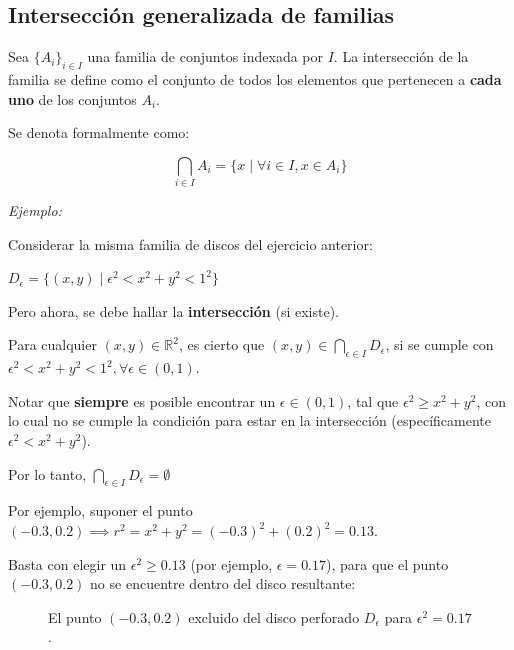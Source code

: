 \documentclass{article}
\begin{document}
\subsection{Intersección generalizada de familias}

Sea $\{A_i\}_{i \in I}$ una familia de conjuntos indexada por $I$. La intersección de la familia se define como el conjunto de todos los elementos que pertenecen a \textbf{cada uno} de los conjuntos $A_i$.

Se denota formalmente como:

\[ \bigcap_{i \in I} A_i = \{x \mid \forall i \in I, x \in A_i\} \]

\textit{Ejemplo:}

Considerar la misma familia de discos del ejercicio anterior:

$D_{\epsilon} = \{(x, y) \mid \epsilon^2 < x^2 + y^2 < 1^2\}$

Pero ahora, se debe hallar la \textbf{intersección} (si existe).

Para cualquier $(x, y) \in \mathbb{R}^2$, es cierto que $(x, y) \in \bigcap_{\epsilon \in I} D_{\epsilon}$, si se cumple con  $\epsilon^2 < x^2 + y^2 < 1^2, \forall \epsilon \in (0, 1)$.

Notar que \textbf{siempre} es posible encontrar un $\epsilon \in (0, 1)$, tal que $\epsilon^2 \ge x^2 + y^2$, con lo cual no se cumple la condición para estar en la intersección (específicamente $\epsilon^2 < x^2 + y^2$).

Por lo tanto, $\bigcap_{\epsilon \in I} D_{\epsilon} = \emptyset$

Por ejemplo, suponer el punto $(-0.3, 0.2) \implies r^2 = x^2 + y^2 = (-0.3)^2 + (0.2)^2 = 0.13$.

Basta con elegir un $\epsilon^2 \ge 0.13$ (por ejemplo, $\epsilon = 0.17$), para que el punto $(-0.3, 0.2)$ no se encuentre dentro del disco resultante:

\begin{figure}[H]
\centering
{}
\caption{El punto $(-0.3, 0.2)$ excluido del disco perforado $D_{\epsilon}$ para $\epsilon^2 = 0.17$.}
\end{figure}
\end{document}
